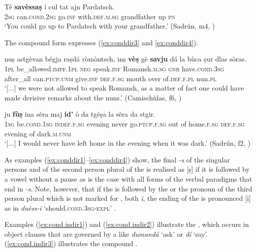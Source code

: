 \ea
\label{ex:conddir2}
\gll  Té \textbf{savèssaṣ} í cul tat ajn Pardatsch.\\
\textsc{2sg} can.\textsc{cond.2sg} go.\textsc{inf} with.\textsc{def.m.sg} grandfather up \textsc{pn}\\
\glt `You could go up to Pardatsch with your grandfather.' (Sadrún, m4, )
\z

The compound form expresses  (\ref{ex:conddir3} and \ref{ex:conddir4}).

\ea
\label{ex:conddir3}
\gll   [...] nuṣ astgèvan bégja raṣdá ròmòntsch, inṣ \textbf{vèṣ} gè \textbf{savju} dá la bùca ṣur dlas sòras.\\
{} \textsc{1pl} be\_allowed.\textsc{impf.1pl} \textsc{neg} speak.\textsc{inf} Romansh.\textsc{m.sg} \textsc{gnr}  have.\textsc{cond.3sg} after\_all can.\textsc{ptcp.unm} give.\textsc{inf} \textsc{def.f.sg} mouth over of.\textsc{def.f.pl} nun.\textsc{pl}\\
\glt `[...] we were not allowed to speak Romansh, as a matter of fact one could have made derisive remarks about the nuns.' (Camischùlas, f6, )
\z

\ea
\label{ex:conddir4}
\gll  [...] ju \textbf{fùṣ} ina sèra maj \textbf{id’} ò da tgèṣa la sèra da stgir. \\
{} \textsc{1sg} be.\textsc{cond.1sg} \textsc{indef.f.sg} evening never go.\textsc{ptcp.f.sg} out of home.\textsc{f.sg} \textsc{def.f.sg} evening of dark.\textsc{m.unm}\\
\glt `[...] I would never have left home in the evening when it was dark.' (Sadrún, f2, )
\z

As examples (\ref{ex:conddir1}--\ref{ex:conddir4}) show, the final \textit{-s} of the singular persons and of the second person plural of the  is realised as [ṣ] if it is followed by a vowel without a pause as is the case with all forms of the verbal paradigms that end in \textit{-s}. Note, however, that if the  is followed by the  or the pronoun of the third person plural which is not marked for , both \textit{i}, the ending of the  is pronounced [i] as in \textit{duèss-i} `should.\textsc{cond.3sg}-\textsc{expl}' .

Examples (\ref{ex:cond.indir1}) and (\ref{ex:cond.indir2}) illustrate the , which occurs in object clauses that are governed by a  like \textit{dumandá} `ask' or \textit{dí} `say'. (\ref{ex:cond.indir3}) illustrates the compound .

